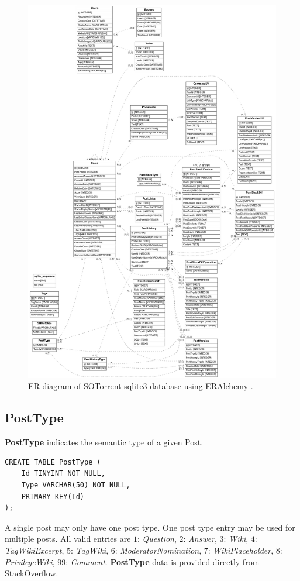\documentclass[a4paper,11pt, notitlepage]{report}
\theoremstyle{definition}
\numberwithin{equation}{section}		%
\begin{document}
\begin{figure}[ht]
    \centering
    \includegraphics[width=6in]{figures/erd_from_sqlite.png}
    \caption{ER diagram of SOTorrent sqlite3 database using ERAlchemy \cite{eralchemy}.}
    \label{fig:er-diagram}
\end{figure}

\subsection{PostType}
\textbf{PostType} indicates the semantic type of a given Post.
\begin{lstlisting}
CREATE TABLE PostType (
    Id TINYINT NOT NULL,
    Type VARCHAR(50) NOT NULL,
    PRIMARY KEY(Id)
);
\end{lstlisting}
A single post may only have one post type. One post type entry may be used for multiple posts. All valid entries are $1$: \textit{Question}, $2$: \textit{Answer}, $3$: \textit{Wiki}, $4$: \textit{TagWikiExcerpt}, $5$: \textit{TagWiki}, $6$: \textit{ModeratorNomination}, $7$: \textit{WikiPlaceholder}, $8$: \textit{PrivilegeWiki}, $99$: \textit{Comment}. \textbf{PostType} data is provided directly from StackOverflow.
\end{document}
